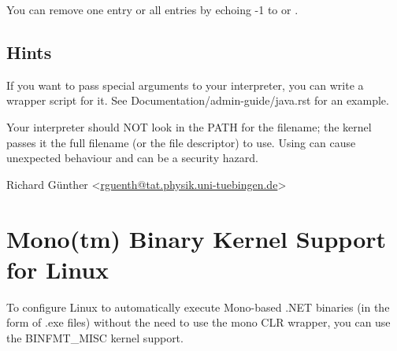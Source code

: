 \documentclass[a4paper,8pt,english]{sphinxmanual}
\begin{document}
You can remove one entry or all entries by echoing -1 to 
or .


\section{Hints}
\label{admin-guide/binfmt-misc:hints}
If you want to pass special arguments to your interpreter, you can
write a wrapper script for it. See Documentation/admin-guide/java.rst for an
example.

Your interpreter should NOT look in the PATH for the filename; the kernel
passes it the full filename (or the file descriptor) to use.  Using  can
cause unexpected behaviour and can be a security hazard.

Richard Günther \textless{}\href{mailto:rguenth@tat.physik.uni-tuebingen.de}{rguenth@tat.physik.uni-tuebingen.de}\textgreater{}


\chapter{Mono(tm) Binary Kernel Support for Linux}
\label{admin-guide/mono:mono-tm-binary-kernel-support-for-linux}\label{admin-guide/mono::doc}
To configure Linux to automatically execute Mono-based .NET binaries
(in the form of .exe files) without the need to use the mono CLR
wrapper, you can use the BINFMT\_MISC kernel support.
\end{document}
